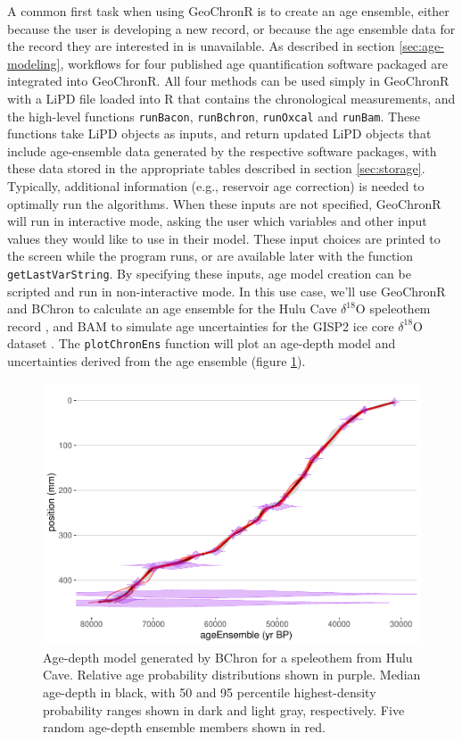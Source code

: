 \documentclass[gchron, manuscript]{copernicus}
\begin{document}
A common first task when using GeoChronR is to create an age ensemble, either because the user is developing a new record, or because the age ensemble data for the record they are interested in is unavailable.
As described in section \ref{sec:age-modeling}, workflows for four published age quantification software packaged are integrated into GeoChronR.
All four methods can be used simply in GeoChronR with a LiPD file loaded into R that contains the chronological measurements, and the high-level functions \texttt{runBacon}, \texttt{runBchron}, \texttt{runOxcal} and \texttt{runBam}.
These functions take LiPD objects as inputs, and return updated LiPD objects that include age-ensemble data generated by the respective software packages, with these data stored in the appropriate tables described in section \ref{sec:storage}.
Typically, additional information (e.g., reservoir age correction) is needed to optimally run the algorithms.
When these inputs are not specified, GeoChronR will run in interactive mode, asking the user which variables and other input values they would like to use in their model.
These input choices are printed to the screen while the program runs, or are available later with the function \texttt{getLastVarString}.
By specifying these inputs, age model creation can be scripted and run in non-interactive mode.
In this use case, we'll use GeoChronR and BChron \citep{parnell2008flexible} to calculate an age ensemble for the Hulu Cave \(\delta^{18}\)O speleothem record \citep{hulu2001}, and BAM \citep{BAM} to simulate age uncertainties for the GISP2 ice core \(\delta^{18}\)O dataset \citep{alley2000}.
The \texttt{plotChronEns} function will plot an age-depth model and uncertainties derived from the age ensemble (figure \ref{fig:age-model}).

\begin{figure}
\includegraphics[width=12cm]{geoChronR-paper_files/figure-latex/age-model-1} \caption{Age-depth model generated by BChron for a speleothem from Hulu Cave. Relative age probability distributions shown in purple. Median age-depth in black, with 50 and 95 percentile highest-density probability ranges shown in dark and light gray, respectively. Five random age-depth ensemble members shown in red.}\label{fig:age-model}
\end{figure}
\end{document}
